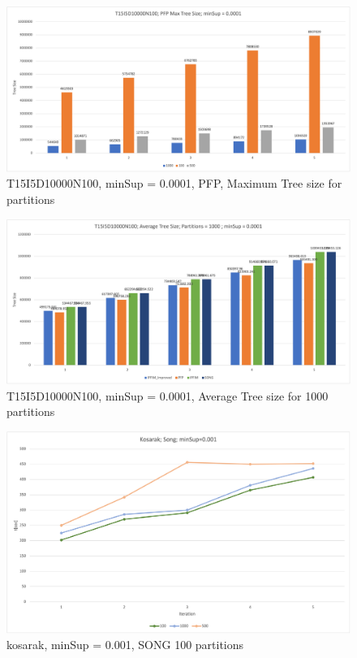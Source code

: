 \begin{figure}
  \centering
  \includegraphics[width=\linewidth]{figures/4iterations/T15I5D10000N100_MaxTree_PFP_0001}
  \caption{T15I5D10000N100, minSup = 0.0001,  PFP, Maximum Tree size for partitions}
  \label{fig:T15I5D10000N100_MaxTree_PFP_0001}
\end{figure}

\begin{figure}
  \centering
  \includegraphics[width=\linewidth]{figures/4iterations/T15I5D10000N100_AvgTree_Partitins1000_0001}
  \caption{T15I5D10000N100, minSup = 0.0001,  Average Tree size for 1000 partitions}
  \label{fig:T15I5D10000N100_AvgTree_Partitins1000_0001}
\end{figure}



\begin{figure}
  \centering
  \includegraphics[width=\linewidth]{figures/4iterations/kosarak_song_001}
  \caption{kosarak, minSup = 0.001, SONG 100 partitions}
  \label{fig:kosarak_song_001}
\end{figure}

